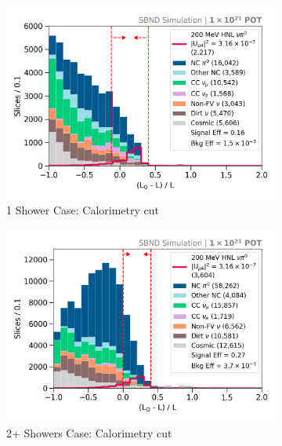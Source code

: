 \begin{figure}[bp!]
        \begin{subfigure}[b]{0.495\textwidth}   
            \centering 
            \includegraphics[width=\textwidth]{opt0frac_one_shw_precut}
            \caption{1 Shower Case: Calorimetry cut}%
        \end{subfigure}
        \hfill
        \begin{subfigure}[b]{0.495\textwidth}   
            \centering 
            \includegraphics[width=\textwidth]{opt0frac_two_shw_precut}
            \caption{2+ Showers Case: Calorimetry cut}%
        \end{subfigure}
        \hfill
	\centering
        \begin{subfigure}[b]{0.495\textwidth}   
            \centering 

\end{subfigure}
\end{figure}

